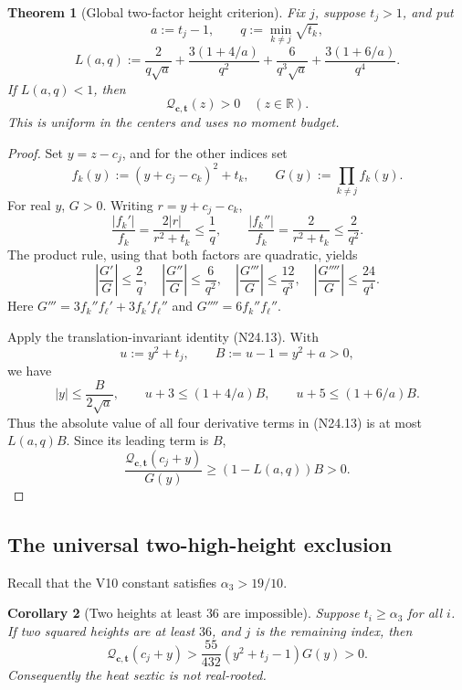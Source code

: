 \documentclass[11pt]{article}
\newtheorem{theorem}{Theorem}[section]
\newtheorem{corollary}[theorem]{Corollary}
\theoremstyle{definition}
\theoremstyle{remark}
\begin{document}
\begin{theorem}[Global two-factor height criterion]
\label{thm:f2v30-height-criterion}
Fix \(j\), suppose \(t_j>1\), and put
\[
 a:=t_j-1,\qquad q:=\min_{k\ne j}\sqrt{t_k},
 \tag{N30.3}
\]
\[
 L(a,q):=\frac{2}{q\sqrt a}
 +\frac{3(1+4/a)}{q^2}
 +\frac{6}{q^3\sqrt a}
 +\frac{3(1+6/a)}{q^4}.
 \tag{N30.4}
\]
If \(L(a,q)<1\), then
\[
 \boxed{\mathcal Q_{\bm c,\bm t}(z)>0\quad(z\in\mathbb R).}
 \tag{N30.5}
\]
This is uniform in the centers and uses no moment budget.
\end{theorem}

\begin{proof}
Set \(y=z-c_j\), and for the other indices set
\[
 f_k(y):=(y+c_j-c_k)^2+t_k,\qquad G(y):=\prod_{k\ne j}f_k(y).
 \tag{N30.6}
\]
For real \(y\), \(G>0\).  Writing \(r=y+c_j-c_k\),
\[
 \frac{|f_k'|}{f_k}=\frac{2|r|}{r^2+t_k}\leq\frac1q,\qquad
 \frac{|f_k''|}{f_k}=\frac2{r^2+t_k}\leq\frac2{q^2}.
 \tag{N30.7}
\]
The product rule, using that both factors are quadratic, yields
\[
 \left|\frac{G'}G\right|\leq\frac2q,\quad
 \left|\frac{G''}G\right|\leq\frac6{q^2},\quad
 \left|\frac{G'''}G\right|\leq\frac{12}{q^3},\quad
 \left|\frac{G''''}G\right|\leq\frac{24}{q^4}.
 \tag{N30.8}
\]
Here \(G'''=3f_k''f_\ell'+3f_k'f_\ell''\) and
\(G''''=6f_k''f_\ell''\).

Apply the translation-invariant identity \textup{(N24.13)}.  With
\[
 u:=y^2+t_j,\qquad B:=u-1=y^2+a>0,
 \tag{N30.9}
\]
we have
\[
 |y|\leq\frac{B}{2\sqrt a},\qquad
 u+3\leq(1+4/a)B,\qquad u+5\leq(1+6/a)B.
 \tag{N30.10}
\]
Thus the absolute value of all four derivative terms in
\textup{(N24.13)} is at most \(L(a,q)B\).  Since its leading term is
\(B\),
\[
 \frac{\mathcal Q_{\bm c,\bm t}(c_j+y)}{G(y)}
 \geq(1-L(a,q))B>0.
 \tag{N30.11}
\]
\end{proof}

\subsection{The universal two-high-height exclusion}

Recall that the V10 constant satisfies \(\alpha_3>19/10\).

\begin{corollary}[Two heights at least \(36\) are impossible]
\label{cor:f2v30-two-high}
Suppose \(t_i\geq\alpha_3\) for all \(i\).  If two squared heights are
at least \(36\), and \(j\) is the remaining index, then
\[
 \boxed{\mathcal Q_{\bm c,\bm t}(c_j+y)
 >\frac{55}{432}(y^2+t_j-1)G(y)>0.}
 \tag{N30.12}
\]
Consequently the heat sextic is not real-rooted.
\end{corollary}
\end{document}
